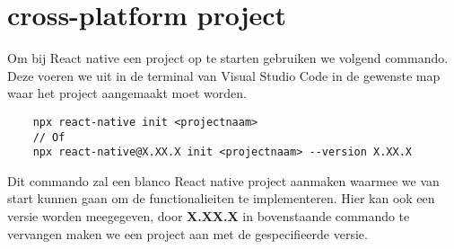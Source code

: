 \section{cross-platform project}
Om bij React native een project op te starten gebruiken we volgend commando. 
Deze voeren we uit in de terminal van Visual Studio Code in de gewenste map waar 
het project aangemaakt moet worden.
\begin{verbatim}
    npx react-native init <projectnaam>
    // Of
    npx react-native@X.XX.X init <projectnaam> --version X.XX.X
\end{verbatim}


Dit commando zal een blanco React native project aanmaken waarmee we van start kunnen gaan 
om de functionalieiten te implementeren. Hier kan ook een versie worden meegegeven, 
door \textbf{X.XX.X} in bovenstaande commando te vervangen maken we een project aan 
met de gespecifieerde versie.

